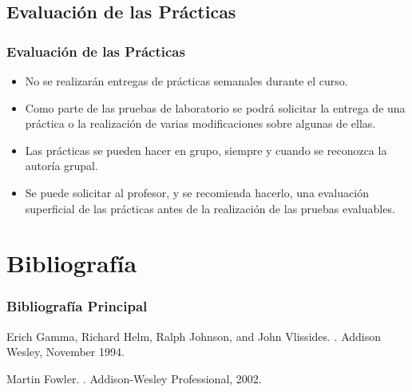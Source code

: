 \documentclass[a4paper,slidestop,xcolor=pst,blue]{beamer}
\begin{document}
\subsection{Evaluación de las Prácticas}

\begin{frame}[c]
    \frametitle{Evaluación de las Prácticas}
	\begin{itemize}[<+->]
        \item<1-> No se realizarán entregas de prácticas semanales durante el curso.
        \item<2-> Como parte de las pruebas de laboratorio se podrá solicitar la entrega de una práctica o la realización de varias modificaciones sobre algunas de ellas.
        \item<3-> Las prácticas se pueden hacer en grupo, siempre y cuando se reconozca la autoría grupal.
        \item<4-> Se puede solicitar al profesor, y se recomienda hacerlo, una evaluación superficial de las prácticas antes de la realización de las pruebas evaluables.
    \end{itemize}
\end{frame}

\section{Bibliografía}

\begin{frame}[c]
	\frametitle{Bibliografía Principal}
    \begin{thebibliography}{1}

Erich Gamma, Richard Helm, Ralph Johnson, and John Vlissides.
.
\newblock Addison Wesley, November 1994.

Martin Fowler.
.
\newblock Addison-Wesley Professional, 2002.

\end{thebibliography}
\end{frame}
\end{document}
